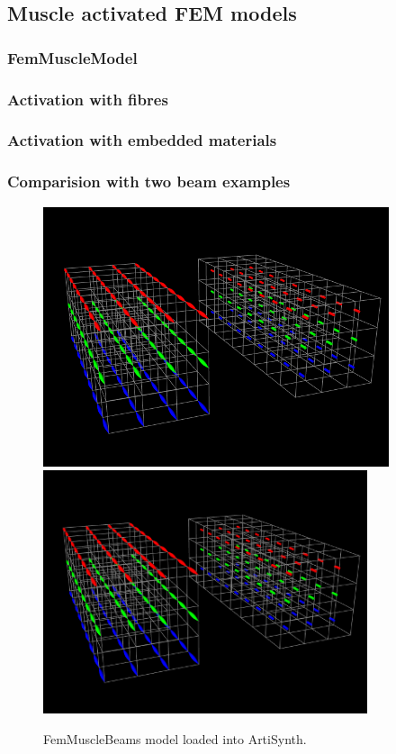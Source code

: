 
\subsection{Muscle activated FEM models}

\subsubsection{FemMuscleModel}

\subsubsection{Activation with fibres}

\subsubsection{Activation with embedded materials}

\subsubsection{Comparision with two beam examples}

\begin{figure}[h]
\begin{center}
\iflatexml
 \includegraphics[]{images/FemMuscleBeams}
\else
 \includegraphics[width=3.75in]{images/FemMuscleBeams}
\fi
\end{center}
\caption{FemMuscleBeams model loaded into ArtiSynth.}
\label{FemMuscleBeams:fig}
\end{figure}

